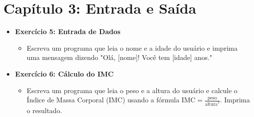 \documentclass{article}
\begin{document}
\section*{Capítulo 3: Entrada e Saída}
\begin{itemize}
    \item \textbf{Exercício 5: Entrada de Dados}
    \begin{itemize}
        \item Escreva um programa que leia o nome e a idade do usuário e imprima uma mensagem dizendo "Olá, [nome]! Você tem [idade] anos."
    \end{itemize}
    \item \textbf{Exercício 6: Cálculo do IMC}
    \begin{itemize}
        \item Escreva um programa que leia o peso e a altura do usuário e calcule o Índice de Massa Corporal (IMC) usando a fórmula \( \text{IMC} = \frac{\text{peso}}{\text{altura}^2} \). Imprima o resultado.
    \end{itemize}
\end{itemize}
\end{document}
